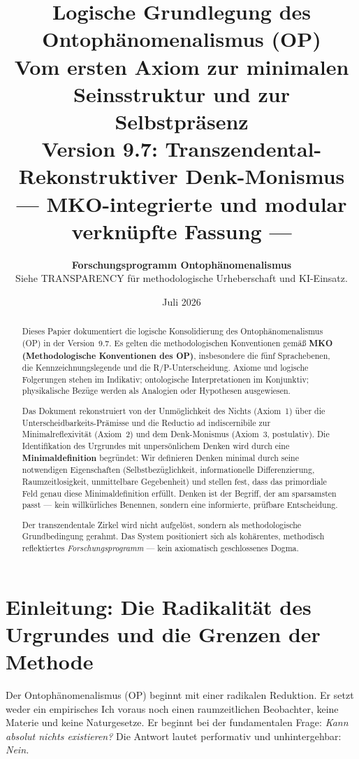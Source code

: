 \documentclass[11pt,a4paper]{article}
\title{
  \textbf{Logische Grundlegung des Ontoph\"{a}nomenalismus (OP)}\\[0.4em]
  \large Vom ersten Axiom zur minimalen Seinsstruktur und zur Selbstpr\"{a}senz\\[0.5em]
  {\normalsize Version 9.7: Transzendental-Rekonstruktiver Denk-Monismus\\
  --- MKO-integrierte und modular verkn\"{u}pfte Fassung ---}
}
\author{
  \textbf{Forschungsprogramm Ontoph\"{a}nomenalismus}\\
  \small Siehe TRANSPARENCY f\"{u}r methodologische Urheberschaft und KI-Einsatz.
}
\date{Juli 2026}
\theoremstyle{plain}
\theoremstyle{definition}
\begin{document}
\maketitle

\begin{abstract}
Dieses Papier dokumentiert die logische Konsolidierung des Ontoph\"{a}nomenalismus (OP)
in der Version~9.7. Es gelten die methodologischen Konventionen gem\"{a}\ss{}
\textbf{MKO (Methodologische Konventionen des OP)}, insbesondere die f\"{u}nf Sprachebenen,
die Kennzeichnungslegende und die R/P-Unterscheidung. Axiome und logische Folgerungen
stehen im Indikativ; ontologische Interpretationen im Konjunktiv; physikalische Bez\"{u}ge
werden als Analogien oder Hypothesen ausgewiesen.

Das Dokument rekonstruiert von der Unm\"{o}glichkeit des Nichts (Axiom~1) \"{u}ber die
Unterscheidbarkeits-Pr\"{a}misse und die Reductio ad indiscernibile zur
Minimalreflexivit\"{a}t (Axiom~2) und dem Denk-Monismus (Axiom~3, postulativ). Die
Identifikation des Urgrundes mit unpers\"{o}nlichem Denken wird durch eine
\textbf{Minimaldefinition} begr\"{u}ndet: Wir definieren Denken minimal durch seine
notwendigen Eigenschaften (Selbstbez\"{u}glichkeit, informationelle Differenzierung,
Raumzeitlosigkeit, unmittelbare Gegebenheit) und stellen fest, dass das primordiale Feld
genau diese Minimaldefinition erf\"{u}llt. Denken ist der Begriff, der am sparsamsten
passt --- kein willk\"{u}rliches Benennen, sondern eine informierte, pr\"{u}fbare
Entscheidung.

Der transzendentale Zirkel wird nicht aufgel\"{o}st, sondern als methodologische
Grundbedingung gerahmt. Das System positioniert sich als koh\"{a}rentes, methodisch
reflektiertes \emph{Forschungsprogramm} --- kein axiomatisch geschlossenes Dogma.
\end{abstract}

\tableofcontents
\newpage

\section{Einleitung: Die Radikalit\"{a}t des Urgrundes und die Grenzen der Methode}

Der Ontoph\"{a}nomenalismus (OP) beginnt mit einer radikalen Reduktion. Er setzt weder ein
empirisches Ich voraus noch einen raumzeitlichen Beobachter, keine Materie und keine
Naturgesetze. Er beginnt bei der fundamentalen Frage: \emph{Kann absolut nichts existieren?}
Die Antwort lautet performativ und unhintergehbar: \emph{Nein.}
\end{document}

